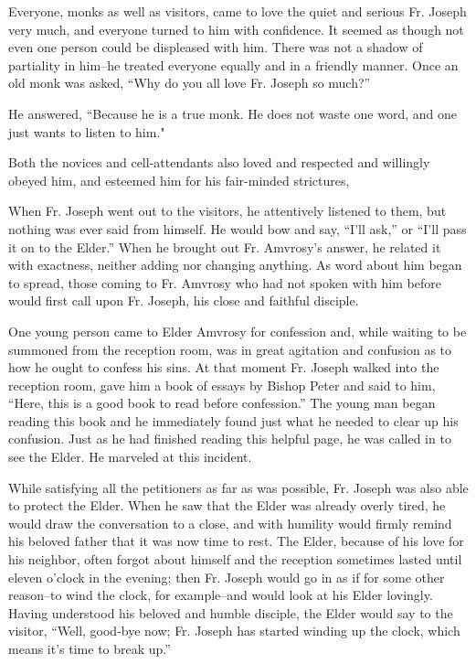 Everyone, monks as well as visitors, came to love the quiet and serious Fr. Joseph very much, and everyone turned to him with confidence. It seemed as though not even one person could be displeased with him. There was not a shadow of partiality in him--he treated everyone equally and in a friendly manner. Once an old monk was asked, “Why do you all love Fr. Joseph so much?”

He answered, “Because he is a true monk. He does not waste one word, and one just wants to listen to him."

Both the novices and cell-attendants also loved and respected and willingly obeyed him, and esteemed him for his fair-minded strictures,

When Fr. Joseph went out to the visitors, he attentively listened to them, but nothing was ever said from himself. He would bow and say, “I'll ask,” or “I'll pass it on to the Elder.” When he brought out Fr. Amvrosy's answer, he related it with exactness, neither adding nor changing anything. As word about him began to spread, those coming to Fr. Amvrosy who had not spoken with him before would first call upon Fr. Joseph, his close and faithful disciple.

One young person came to Elder Amvrosy for confession and, while waiting to be summoned from the reception room, was in great agitation and confusion as to how he ought to confess his sins. At that moment Fr. Joseph walked into the reception room, gave him a book of essays by Bishop Peter and said to him, “Here, this is a good book to read before confession.” The young man began reading this book and he immediately found just what he needed to clear up his confusion. Just as he had finished reading this helpful page, he was called in to see the Elder. He marveled at this incident.

While satisfying all the petitioners as far as was possible, Fr. Joseph was also able to protect the Elder. When he saw that the Elder was already overly tired, he would draw the conversation to a close, and with humility would firmly remind his beloved father that it was now time to rest. The Elder, because of his love for his neighbor, often forgot about himself and the reception sometimes lasted until eleven o'clock in the evening; then Fr. Joseph would go in as if for some other reason--to wind the clock, for example--and would look at his Elder lovingly. Having understood his beloved and humble disciple, the Elder would say to the visitor, “Well, good-bye now; Fr. Joseph has started winding up the clock, which means it's time to break up.”

